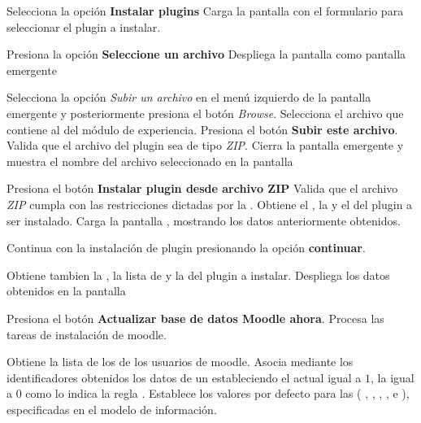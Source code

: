 \begin{UCtrayectoria}%
%

    \Actor Selecciona la opción {\bf Instalar plugins}
    \Sistema Carga la pantalla  con el formulario para seleccionar el
             plugin a instalar. \label{CU-E01-formulario-instalacion}

    \Actor Presiona la opción {\bf Seleccione un archivo}
    \Sistema Despliega la pantalla  como pantalla emergente
             \label{CU-E01-seleccion-archivo}

    \Actor Selecciona la opción {\it Subir un archivo} en el menú izquierdo de la pantalla
           emergente y posteriormente presiona el botón {\it Browse}.
    \Actor Selecciona el archivo que contiene al  del módulo de experiencia.
    \Actor Presiona el botón {\bf Subir este archivo}.
    \Sistema Valida que el archivo del plugin sea de tipo {\it ZIP}. 
    \Sistema Cierra la pantalla emergente y muestra el nombre del archivo seleccionado en la
             pantalla 

    \Actor Presiona el botón {\bf Instalar plugin desde archivo ZIP}
    \Sistema Valida que el archivo {\it ZIP} cumpla con las restricciones dictadas por la
             . 
    \Sistema Obtiene el , la  y el
              del plugin a ser instalado.
    \Sistema Carga la pantalla , mostrando los datos anteriormente obtenidos.

    \Actor Continua con la instalación de plugin presionando la opción {\bf continuar}. 

    \Sistema Obtiene tambien la , la lista de 
             y la  del plugin a instalar. 
             \label{CU-E01-comprobacion}
    \Sistema Despliega los datos obtenidos en la pantalla 

    \Actor Presiona el botón {\bf Actualizar base de datos Moodle ahora}. 
    \Sistema Procesa las tareas de instalación de moodle.

    \Sistema Obtiene la lista de los  de los
             usuarios de moodle.
    \Sistema Asocia mediante los identificadores obtenidos los datos de un
              estableciendo el  actual igual
             a $1$, la  igual a $0$ como lo indica la regla
             .
    \Sistema Establece los valores por defecto para las  (
              ,
              ,
              ,
              ,
               e
              ), especificadas en el modelo de información.


\end{UCtrayectoria}

